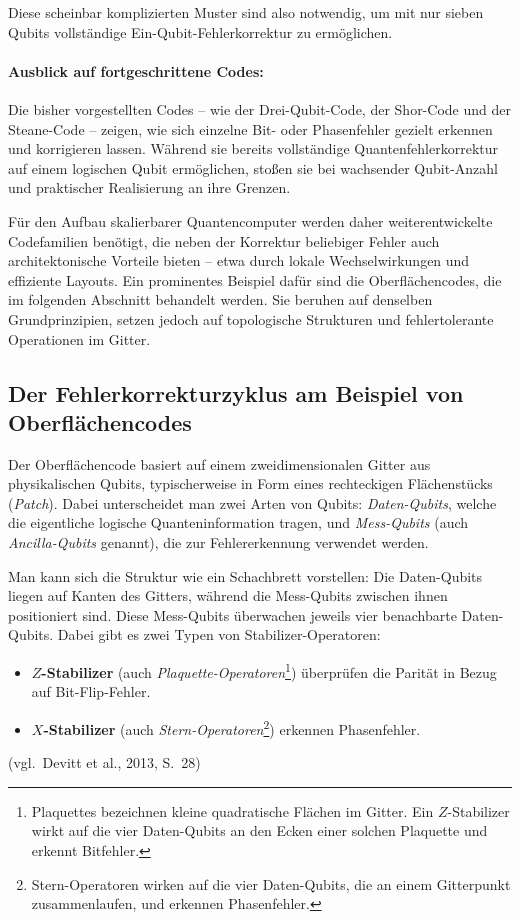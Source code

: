 \noindent
Diese scheinbar komplizierten Muster sind also notwendig, um mit nur sieben Qubits vollständige Ein-Qubit-Fehlerkorrektur zu ermöglichen.
\cite[Seite 12]{devitt_qec_2013}\\

\paragraph{Ausblick auf fortgeschrittene Codes:}

Die bisher vorgestellten Codes – wie der Drei-Qubit-Code, der Shor-Code und der Steane-Code – zeigen, wie sich einzelne Bit- oder Phasenfehler gezielt erkennen und korrigieren lassen. Während sie bereits vollständige Quantenfehlerkorrektur auf einem logischen Qubit ermöglichen, stoßen sie bei wachsender Qubit-Anzahl und praktischer Realisierung an ihre Grenzen.

Für den Aufbau skalierbarer Quantencomputer werden daher weiterentwickelte Codefamilien benötigt, die neben der Korrektur beliebiger Fehler auch architektonische Vorteile bieten – etwa durch lokale Wechselwirkungen und effiziente Layouts. Ein prominentes Beispiel dafür sind die Oberflächencodes, die im folgenden Abschnitt behandelt werden. Sie beruhen auf denselben Grundprinzipien, setzen jedoch auf topologische Strukturen und fehlertolerante Operationen im Gitter.


\subsection{Der Fehlerkorrekturzyklus am Beispiel von Oberflächencodes}\label{chap:QEC3.2}

Der Oberflächencode basiert auf einem zweidimensionalen Gitter aus physikalischen Qubits, typischerweise in Form eines rechteckigen Flächenstücks (\emph{Patch}). Dabei unterscheidet man zwei Arten von Qubits: \emph{Daten-Qubits}, welche die eigentliche logische Quanteninformation tragen, und \emph{Mess-Qubits} (auch \emph{Ancilla-Qubits} genannt), die zur Fehlererkennung verwendet werden.



Man kann sich die Struktur wie ein Schachbrett vorstellen: Die Daten-Qubits liegen auf Kanten des Gitters, während die Mess-Qubits zwischen ihnen positioniert sind. Diese Mess-Qubits überwachen jeweils vier benachbarte Daten-Qubits. Dabei gibt es zwei Typen von Stabilizer-Operatoren:
\begin{itemize}
  \item \textbf{\(Z\)-Stabilizer} (auch \emph{Plaquette-Operatoren}\footnote{Plaquettes bezeichnen kleine quadratische Flächen im Gitter. Ein \(Z\)-Stabilizer wirkt auf die vier Daten-Qubits an den Ecken einer solchen Plaquette und erkennt Bitfehler.}) überprüfen die Parität in Bezug auf Bit-Flip-Fehler.
  \item \textbf{\(X\)-Stabilizer} (auch \emph{Stern-Operatoren}\footnote{Stern-Operatoren wirken auf die vier Daten-Qubits, die an einem Gitterpunkt zusammenlaufen, und erkennen Phasenfehler.}) erkennen Phasenfehler.
\end{itemize}
(vgl.\ Devitt et al., 2013, S.~28)

